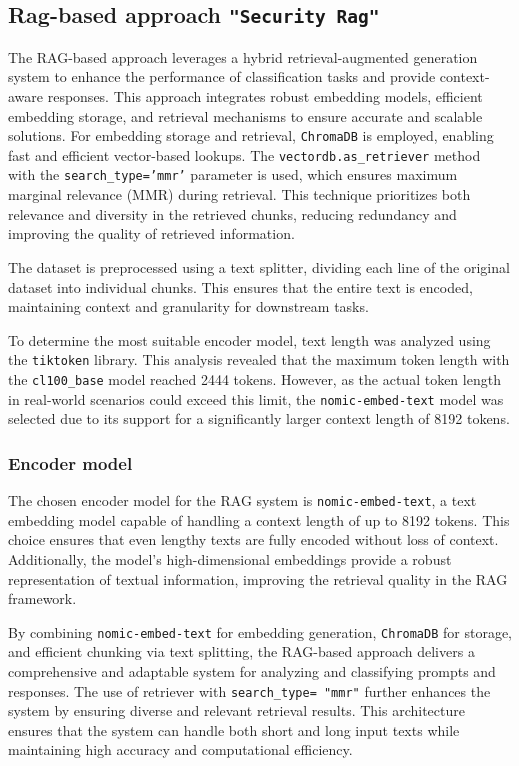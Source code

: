 \documentclass{article}
\begin{document}
\subsection{Rag-based approach \texttt{"Security Rag"}}

The RAG-based approach leverages a hybrid retrieval-augmented generation system to enhance the performance of classification tasks and provide context-aware responses. This approach integrates robust embedding models, efficient embedding storage, and retrieval mechanisms to ensure accurate and scalable solutions. For embedding storage and retrieval, \texttt{ChromaDB} is employed, enabling fast and efficient vector-based lookups. The \texttt{vectordb.as\_retriever} method with the \texttt{search\_type='mmr'} parameter is used, which ensures maximum marginal relevance (MMR) during retrieval. This technique prioritizes both relevance and diversity in the retrieved chunks, reducing redundancy and improving the quality of retrieved information.

The dataset is preprocessed using a text splitter, dividing each line of the original dataset into individual chunks. This ensures that the entire text is encoded, maintaining context and granularity for downstream tasks.

To determine the most suitable encoder model, text length was analyzed using the \texttt{tiktoken} library. This analysis revealed that the maximum token length with the \texttt{cl100\_base} model reached 2444 tokens. However, as the actual token length in real-world scenarios could exceed this limit, the \texttt{nomic-embed-text} model was selected due to its support for a significantly larger context length of 8192 tokens.

\subsubsection{Encoder model}

The chosen encoder model for the RAG system is \texttt{nomic-embed-text}, a text embedding model capable of handling a context length of up to 8192 tokens. This choice ensures that even lengthy texts are fully encoded without loss of context. Additionally, the model's high-dimensional embeddings provide a robust representation of textual information, improving the retrieval quality in the RAG framework.

By combining \texttt{nomic-embed-text} for embedding generation, \texttt{ChromaDB} for storage, and efficient chunking via text splitting, the RAG-based approach delivers a comprehensive and adaptable system for analyzing and classifying prompts and responses. The use of retriever with \texttt{search\_type= "mmr"} further enhances the system by ensuring diverse and relevant retrieval results. This architecture ensures that the system can handle both short and long input texts while maintaining high accuracy and computational efficiency.
\end{document}

